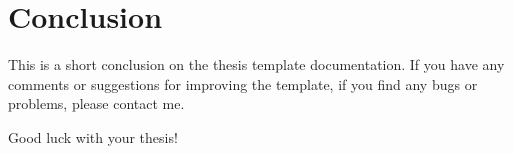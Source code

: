 \chapter{Conclusion}
This is a short conclusion on the thesis template documentation. If you have any comments or suggestions for improving the template, if you find any bugs or problems, please contact me. 

\vspace{2cm}

Good luck with your thesis!